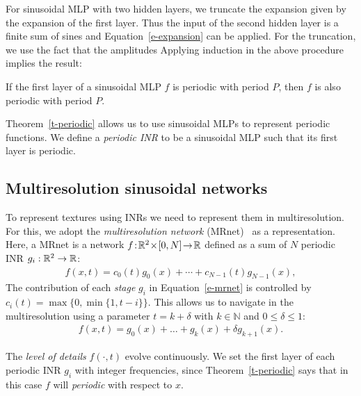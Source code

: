 For sinusoidal MLP with two hidden layers, we truncate the expansion given by the expansion of the first layer. Thus the input of the second hidden layer is a finite sum of sines and Equation~\ref{e-expansion} can be applied.
For the truncation, we use the fact that the amplitudes
Applying induction in the above procedure implies the result:
\begin{theorem}
\label{t-periodic}
    If the first layer of a sinusoidal MLP $f$ is periodic with period $P$, then $f$ is also periodic with period $P$.
\end{theorem}

Theorem~\ref{t-periodic} allows us to use sinusoidal MLPs to represent periodic functions. 
We define a \textit{periodic INR} to be a sinusoidal MLP such that its first layer is periodic. 

\subsection{Multiresolution sinusoidal networks}\label{s-mr-networks}
\label{s-multiresolution}

To represent textures using INRs we need to represent them in multiresolution. For this, we adopt the \textit{multiresolution network} (MRnet)~\cite{paz2022,paz2023mr} as a representation. Here, a MRnet is a network $f\!:\!\mathbb{R}^2\!\times\! [0,N]\!\to\! \mathbb{R}$ defined as a sum of $N$ periodic INR $g_i:\mathbb{R}^2\to\mathbb{R}$:
\begin{align}\label{e-mrnet}
f(x,t) = c_0(t)g_0(x) + \cdots + c_{N-1}(t)g_{N-1}(x),
\end{align}
The contribution of each \textit{stage} $g_i$ in Equation~\ref{e-mrnet} is controlled by $
c_i(t)\!=\!\max\big\{0, \min\big\{1, t-i\big\}\big\}.$
This allows us to navigate in the multiresolution using a parameter $t\!=\!k+\delta$ with $k\in\mathbb{N}$ and $0\leq\delta\leq 1$:
\begin{align}\label{e-mrnet2}
f(x,t)=g_0(x)+\dots + g_k(x)+\delta g_{k+1}(x).
\end{align}

The \textit{level of details} $f(\cdot, t)$ evolve continuously.
We set the first layer of each periodic INR $g_i$ with integer frequencies, since Theorem~\ref{t-periodic} says that in this case $f$ will \textit{periodic} with respect to $x$.

